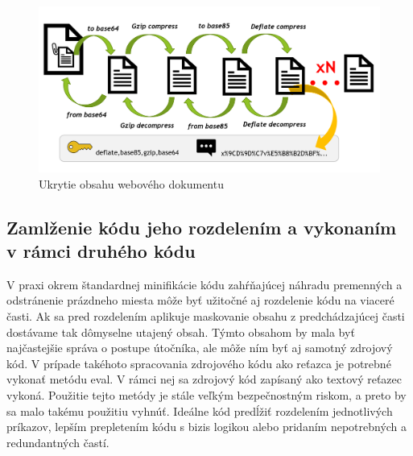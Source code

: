 \documentclass[conference, 11pt,slovak,a4paper,twoside]{IEEEtran}
\begin{document}
\begin{figure}[!t]  %
					\begin{center}
									\includegraphics[width=\linewidth]{fig/masking.png}
									\caption{Ukrytie obsahu webového dokumentu}
									\label{contentConcealing}
					\end{center}
\end{figure}


\subsection{Zamlženie kódu jeho rozdelením a vykonaním v rámci druhého kódu}

V praxi okrem štandardnej minifikácie kódu zahŕňajúcej náhradu premenných a odstránenie prázdneho miesta môže byť užitočné aj rozdelenie kódu na viaceré časti. Ak sa pred rozdelením aplikuje maskovanie obsahu z predchádzajúcej časti dostávame tak dômyselne utajený obsah. Týmto obsahom by mala byť najčastejšie správa o postupe útočníka, ale môže ním byť aj samotný zdrojový kód. V prípade takéhoto spracovania zdrojového kódu ako reťazca je potrebné vykonať metódu eval. V rámci nej sa zdrojový kód zapísaný ako textový reťazec vykoná. Použitie tejto metódy je stále veľkým bezpečnostným riskom, a preto by sa malo takému použitiu vyhnúť. Ideálne kód predĺžiť rozdelením jednotlivých príkazov, lepším prepletením kódu s bizis logikou alebo pridaním nepotrebných a redundantných častí.
\end{document}
